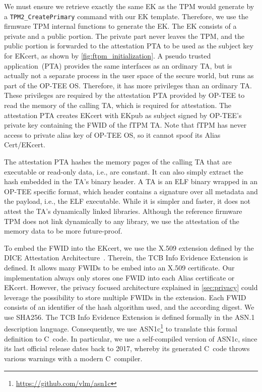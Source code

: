We must ensure we retrieve exactly the same EK as the TPM would generate by a \texttt{TPM2\_CreatePrimary} command with our EK template.
Therefore, we use the firmware TPM internal functions to generate the EK\@.
The EK consists of a private and a public portion.
The private part never leaves the TPM, and the public portion is forwarded to the attestation PTA to be used as the subject key for EKcert, as shown by \autoref{fig:ftpm_initialization}.
A pseudo trusted application~(PTA) provides the same interfaces as an ordinary TA, but is actually not a separate process in the user space of the secure world, but runs as part of the OP-TEE OS\@.
Therefore, it has more privileges than an ordinary TA\@.
These privileges are required by the attestation PTA provided by OP-TEE to read the memory of the calling TA, which is required for attestation.
The attestation PTA creates EKcert with EKpub as subject signed by OP-TEE's private key containing the FWID of the fTPM TA\@.
Note that fTPM has never access to private alias key of OP-TEE OS, so it cannot spoof its Alias Cert/EKcert.

The attestation PTA hashes the memory pages of the calling TA that are executable or read-only data, i.e., are constant.
It can also simply extract the hash embedded in the TA's binary header.
A TA is an ELF binary wrapped in an OP-TEE specific format, which header contains a signature over all metadata and the payload, i.e., the ELF executable.
While it is simpler and faster, it does not attest the TA's dynamically linked libraries.
Although the reference firmware TPM does not link dynamically to any library, we use the attestation of the memory data to be more future-proof.

To embed the FWID into the EKcert, we use the X.509 extension defined by the DICE Attestation Architecture~\cite{TCGAttestation2021}.
Therein, the TCB Info Evidence Extension is defined.
It allows many FWIDs to be embed into an X.509 certificate.
Our implementation always only stores one FWID into each Alias certificate or EKcert.
However, the privacy focused architecture explained in \autoref{sec:privacy} could leverage the possibility to store multiple FWIDs in the extension.
Each FWID consists of an identifier of the hash algorithm used, and the according digest.
We use SHA256.
The TCB Info Evidence Extension is defined formally in the ASN.1 description language.
Consequently, we use ASN1c\footnote{\url{https://github.com/vlm/asn1c}} to translate this formal definition to C~code.
In particular, we use a self-compiled version of ASN1c, since its last official release dates back to 2017, whereby its generated C~code throws various warnings with a modern C~compiler.

